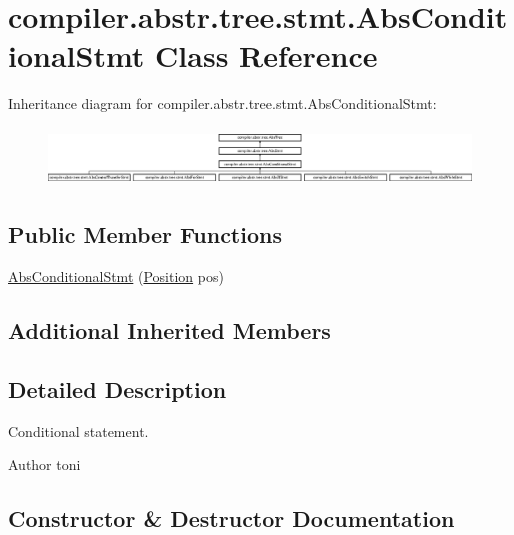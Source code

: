 \hypertarget{classcompiler_1_1abstr_1_1tree_1_1stmt_1_1_abs_conditional_stmt}{}\section{compiler.\+abstr.\+tree.\+stmt.\+Abs\+Conditional\+Stmt Class Reference}
\label{classcompiler_1_1abstr_1_1tree_1_1stmt_1_1_abs_conditional_stmt}
Inheritance diagram for compiler.\+abstr.\+tree.\+stmt.\+Abs\+Conditional\+Stmt\+:\begin{figure}[H]
\begin{center}
\leavevmode
\includegraphics[height=1.550173cm]{classcompiler_1_1abstr_1_1tree_1_1stmt_1_1_abs_conditional_stmt}
\end{center}
\end{figure}
\subsection*{Public Member Functions}
\begin{DoxyCompactItemize}
\item 
\hyperlink{classcompiler_1_1abstr_1_1tree_1_1stmt_1_1_abs_conditional_stmt_a2db47ed99f6c9ad9963ac3035793bc4b}{Abs\+Conditional\+Stmt} (\hyperlink{classcompiler_1_1_position}{Position} pos)
\end{DoxyCompactItemize}
\subsection*{Additional Inherited Members}


\subsection{Detailed Description}
Conditional statement. \begin{DoxyAuthor}{Author}
toni 
\end{DoxyAuthor}


\subsection{Constructor \& Destructor Documentation}
\mbox{\label{classcompiler_1_1abstr_1_1tree_1_1stmt_1_1_abs_conditional_stmt_a2db47ed99f6c9ad9963ac3035793bc4b}} 

